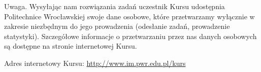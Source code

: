 \documentclass[10pt]{article}
\begin{document}
Uwaga. Wysyłając nam rozwiązania zadań uczestnik Kursu udostępnia Politechnice Wrocławskiej swoje dane osobowe, które przetwarzamy wyłącznie w zakresie niezbędnym do jego prowadzenia (odesłanie zadań, prowadzenie statystyki). Szczegółowe informacje o przetwarzaniu przez nas danych osobowych są dostępne na stronie internetowej Kursu.

Adres internetowy Kursu: \href{http://www.im.pwr.edu.pl/kurs}{http://www.im.pwr.edu.pl/kurs}
\end{document}
